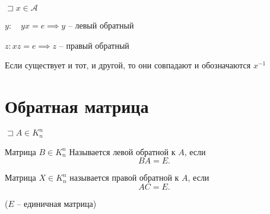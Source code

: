 \documentclass{book}
\theoremstyle{definition}
\begin{document}
\begin{definition}
    $\sqsupset x\in \mathcal{A}$

    $y:\quad yx = e \implies y$ -- левый обратный

    $z: xz = e \implies z$ -- правый обратный
\end{definition}

\begin{statement}
    Если существует и тот, и другой, то они совпадают и обозначаются $x^{-1}$
\end{statement}

\section{Обратная матрица}

$\sqsupset A \in K_n^n$

\begin{definition}
    Матрица $B\in K_n^n$ Называется левой обратной к  $A$, если
     \[
    BA=E
    .\]

    Матрица $X\in K_n^n$ называется правой обратной к $A$, если  
    \[
    AC=E
    .\] 

    ($E$ -- единичная матрица)
\end{definition}
\end{document}
